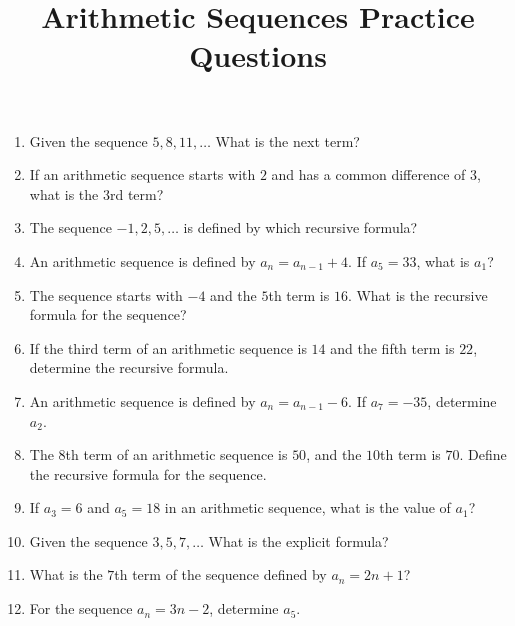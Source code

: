 \documentclass{article}
\begin{document}
\title{Arithmetic Sequences Practice Questions}
\author{}
\date{}
\maketitle

\begin{enumerate}[itemsep=2em] %
    \item Given the sequence $5, 8, 11, \ldots$ What is the next term?
    
    \item If an arithmetic sequence starts with $2$ and has a common difference of $3$, what is the $3$rd term?
    
    \item The sequence $-1, 2, 5, \ldots$ is defined by which recursive formula?
    
    \item An arithmetic sequence is defined by $a_n = a_{n-1} + 4$. If $a_5 = 33$, what is $a_1$?
    
    \item The sequence starts with $-4$ and the $5$th term is $16$. What is the recursive formula for the sequence?
    
    \item If the third term of an arithmetic sequence is $14$ and the fifth term is $22$, determine the recursive formula.
    
    \item An arithmetic sequence is defined by $a_n = a_{n-1} - 6$. If $a_7 = -35$, determine $a_2$.
    
    \item The $8$th term of an arithmetic sequence is $50$, and the $10$th term is $70$. Define the recursive formula for the sequence.
    
    \item If $a_3 = 6$ and $a_5 = 18$ in an arithmetic sequence, what is the value of $a_1$?

    \item Given the sequence $3, 5, 7, \ldots$ What is the explicit formula?
    
    \item What is the $7$th term of the sequence defined by $a_n = 2n + 1$?
    
    \item For the sequence $a_n = 3n - 2$, determine $a_5$.
    

\end{enumerate}
\end{document}

